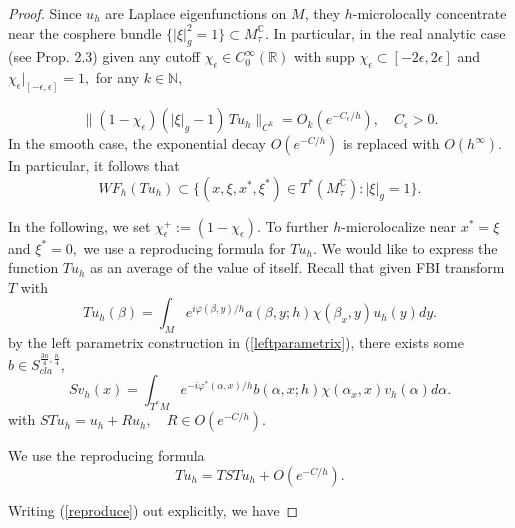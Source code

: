 \documentclass[11pt,reqno]{amsart}
\newcommand{\R}{{\mathbb R}}
\newcommand{\N}{{\mathbb N}}
\theoremstyle{definition}
\begin{document}
\begin{proof}

Since $u_h$  are Laplace eigenfunctions on $M$, they $h$-microlocally concentrate near the cosphere bundle $\{|\xi|_g^2=1\}\subset M^{\mathbb{C}}_{\tau}$. In particular, in the real analytic case  (see \cite{GT19} Prop. 2.3) given any cutoff $ \chi_{\epsilon} \in C^{\infty}_0 (\R)$ with supp $\chi_{\epsilon} \subset [-2\epsilon, 2\epsilon] $ and $\chi_{\epsilon} |_{[-\epsilon, \epsilon]} = 1,$ for any $k \in \N,$

$$ \| (1- \chi_{\epsilon}) ( |\xi|_g -1) \, T u_h \|_{C^{k}} = O_{k} (e^{-C_{\epsilon}/h}), \quad C_{\epsilon} >0.$$
In the smooth case, the exponential decay $O(e^{-C/h})$ is replaced with $O(h^{\infty}).$
In particular, it follows that $$
WF_h(Tu_h)\subset \{(x,\xi,x^*,\xi^*)\in T^*(M ^{\mathbb{C}}_{\tau}):|\xi|_g=1\}.
$$

In the following, we set $\chi_{\epsilon}^+:= (1-\chi_{\epsilon}).$
To further $h$-microlocalize near $x^*= \xi$ and $\xi^*=0,$ we use a reproducing formula for $Tu_h$.  We would like to express the function $Tu_h$ as an average of the value of itself. 
Recall that given FBI transform $T$ with
$$
Tu_h(\beta)=\int_Me^{i\varphi(\beta,y)/h}a(\beta,y;h)\chi(\beta_x,y)u_h(y)dy.
$$
by the left parametrix construction in (\ref{leftparametrix}), there exists some $b\in S_{cla}^{\frac{3n}{4},\frac{n}{4}}$, 
$$
Sv_h(x)=\int_{T^*M}e^{-i\varphi^*(\alpha,x)/h}b(\alpha,x;h)\chi(\alpha_x,x)v_h(\alpha)d\alpha.
$$
with $STu_h=u_h+Ru_h,\quad R\in O(e^{-C/h})$. 

We use the reproducing formula
\begin{equation} \label{reproduce}
T u_h =  T S Tu_h + O(e^{-C/h}).
\end{equation}


Writing (\ref{reproduce}) out explicitly, we have


\end{proof}
\end{document}
